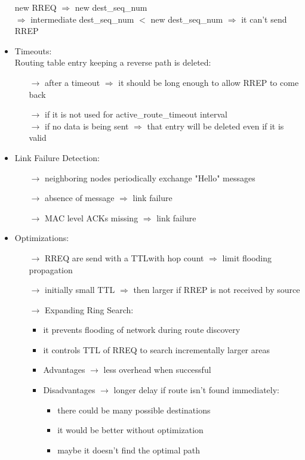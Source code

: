 \begin{itemize}
    new RREQ $\Rightarrow$ new dest\_seq\_num\\$\Rightarrow$ intermediate dest\_seq\_num $<$ new dest\_seq\_num
    $\Rightarrow$ it can't send RREP
    \item Timeouts:\\[0.15cm]
    Routing table entry keeping a reverse path is deleted:
    \begin{itemize}
        \item[$\rightarrow$] after a timeout $\Rightarrow$ it should be long enough to allow RREP to come back
        \item[$\rightarrow$] if it is not used for active\_route\_timeout interval\\
        $\rightarrow$ if no data is being sent $\Rightarrow$ that entry will be deleted even if it is valid
    \end{itemize}
    \item Link Failure Detection:
    \begin{itemize}
        \item[$\rightarrow$] neighboring nodes periodically exchange "Hello" messages
        \item[$\rightarrow$] absence of message $\Rightarrow$ link failure
        \item[$\rightarrow$] MAC level ACKs missing $\Rightarrow$ link failure
    \end{itemize}
    \item Optimizations:
    \begin{itemize}
        \item[$\rightarrow$] RREQ are send with a TTL\footTTL with hop count $\Rightarrow$ limit flooding propagation
        \item[$\rightarrow$] initially small TTL $\Rightarrow$ then larger if RREP is not received by source
        \item[$\rightarrow$] Expanding Ring Search:
        \begin{itemize}
            \item it prevents flooding of network during route discovery
            \item it controls TTL of RREQ to search incrementally larger areas
            \item Advantages $\rightarrow$ less overhead when successful
            \item Disadvantages $\rightarrow$ longer delay if route isn't found immediately:
            \begin{itemize}
                \item there could be many possible destinations
                \item it would be better without optimization
                \item maybe it doesn't find the optimal path
            \end{itemize}
        \end{itemize}
    \end{itemize}
\end{itemize}

